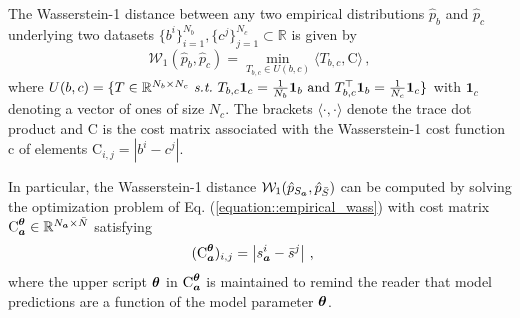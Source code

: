 \documentclass[letterpaper]{article}
\renewcommand{\eqref}[1]{Eq. (\ref{#1})}
\theoremstyle{definition}
\newcommand{\W}{\mathcal{W}}
\newcommand{\bs}{\bar{s}}
\newcommand{\bS}{\bar{S}}
\newcommand{\tc}{\textrm{c}}
\renewcommand{\tC}{\textrm{C}}
\newcommand{\st}{\emph{s.t.}}
\begin{document}
The Wasserstein-1 distance between any two empirical distributions $\hat{p}_{b}$ and $\hat{p}_{c}$ underlying two datasets $\{b^i \}_{i=1}^{N_b}, \{ c^j  \}_{j=1}^{N_c}  \subset \mathbb{R}$ is given by
\begin{equation}\label{equation::empirical_wass}
    \W_1(\hat{p}_b, \hat{p}_c) = \min_{T_{b,c}\in U(b,c)} \langle  T_{b,c} , \tC  \rangle\,,
\end{equation}
where $U(b,c) = \{ T \in \mathbb{R}^{N_b \times N_c}~\st~T_{b,c}\mathbf{1}_c = \frac{1}{N_b}\mathbf{1}_b \text{ and } T_{b,c}^\top \mathbf{1}_b = \frac{1}{N_c} \mathbf{1}_c\}$ with $\mathbf{1}_c$ denoting a vector of ones of size $N_c$.
The brackets $\langle \cdot, \cdot \rangle$ denote the trace dot product and $\tC$ is the cost matrix associated with the Wasserstein-1 cost function $\tc$ of elements $\tC_{i,j} = |b^i - c^j|$.

In particular, the Wasserstein-1 distance $\W_1(\hat{p}_{S_\va},\hat{p}_{\bS})$ can be computed by solving the optimization problem of \eqref{equation::empirical_wass} with cost matrix $\tC_{\va}^\vtheta \in \mathbb{R}^{N_{\va} \times \bar{N}}$ satisfying 
\begin{align*}
(\tC_{\va}^\vtheta)_{i,j} &= \left|s_{\va}^i - \bs^j  \right|\,,
\end{align*}
where the upper script ${\bm{\theta}}$ in $\tC_{\va}^\vtheta$ is maintained to remind the reader that model predictions are a function of the model parameter ${\bm{\theta}}$.
\end{document}

